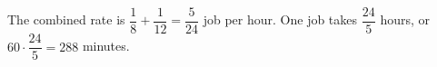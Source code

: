 The combined rate is $\dfrac{1}{8}+\dfrac{1}{12}=\dfrac{5}{24}$ job per hour. One job takes $\dfrac{24}{5}$ hours, or $60\cdot\dfrac{24}{5}=\boxed{288}$ minutes.
